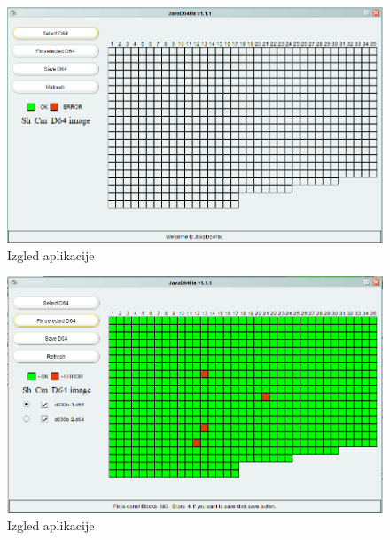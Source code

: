 \begin{figure}[ht]
\begin{center}
\includegraphics[width=\textwidth]{img/aplikacija.png}
\caption{Izgled aplikacije}
\label{img:aplikacija}
\end{center}
\end{figure}

\begin{figure}[ht]
\begin{center}
\includegraphics[width=\textwidth]{img/aplikacija1.png}
\caption{Izgled aplikacije}
\label{img:aplikacija1}
\end{center}
\end{figure}
